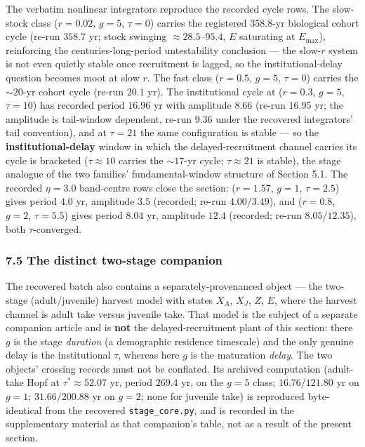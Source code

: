 \documentclass[11pt]{article}
\begin{document}
The verbatim nonlinear integrators reproduce the recorded cycle rows.
The slow-stock class (\(r = 0.02\), \(g = 5\), \(\tau = 0\)) carries the
registered \(358.8\)-yr biological cohort cycle (re-run \(358.7\) yr;
stock swinging \(\approx 28.5\)--\(95.4\), \(E\) saturating at
\(E_{\max}\)), reinforcing the centuries-long-period untestability
conclusion --- the slow-\(r\) system is not even quietly stable once
recruitment is lagged, so the institutional-delay question becomes moot
at slow \(r\). The fast class (\(r = 0.5\), \(g = 5\), \(\tau = 0\))
carries the \(\sim 20\)-yr cohort cycle (re-run \(20.1\) yr). The
institutional cycle at (\(r = 0.3\), \(g = 5\), \(\tau = 10\)) has
recorded period \(16.96\) yr with amplitude \(8.66\) (re-run \(16.95\)
yr; the amplitude is tail-window dependent, re-run \(9.36\) under the
recovered integrators' tail convention), and at \(\tau = 21\) the same
configuration is stable --- so the \textbf{institutional-delay} window
in which the delayed-recruitment channel carries its cycle is bracketed
(\(\tau \approx 10\) carries the \(\sim 17\)-yr cycle;
\(\tau \approx 21\) is stable), the stage analogue of the two families'
fundamental-window structure of Section 5.1. The recorded \(\eta = 3.0\)
band-centre rows close the section: (\(r = 1.57\), \(g = 1\),
\(\tau = 2.5\)) gives period \(4.0\) yr, amplitude \(3.5\) (recorded;
re-run \(4.00\)/\(3.49\)), and (\(r = 0.8\), \(g = 2\), \(\tau = 5.5\))
gives period \(8.04\) yr, amplitude \(12.4\) (recorded; re-run
\(8.05\)/\(12.35\)), both \(\tau\)-converged.

\subsubsection{7.5 The distinct two-stage
companion}\label{the-distinct-two-stage-companion}

The recovered batch also contains a separately-provenanced object ---
the two-stage (adult/juvenile) harvest model with states \(X_A\),
\(X_J\), \(Z\), \(E\), where the harvest channel is adult take versus
juvenile take. That model is the subject of a separate companion article
and is \textbf{not} the delayed-recruitment plant of this section: there
\(g\) is the stage \emph{duration} (a demographic residence timescale)
and the only genuine delay is the institutional \(\tau\), whereas here
\(g\) is the maturation \emph{delay}. The two objects' crossing records
must not be conflated. Its archived computation (adult-take Hopf at
\(\tau^* \approx 52.07\) yr, period \(269.4\) yr, on the \(g=5\) class;
\(16.76\)/\(121.80\) yr on \(g=1\); \(31.66\)/\(200.88\) yr on \(g=2\);
none for juvenile take) is reproduced byte-identical from the recovered
\texttt{stage\_core.py}, and is recorded in the supplementary material
as that companion's table, not as a result of the present section.
\end{document}
